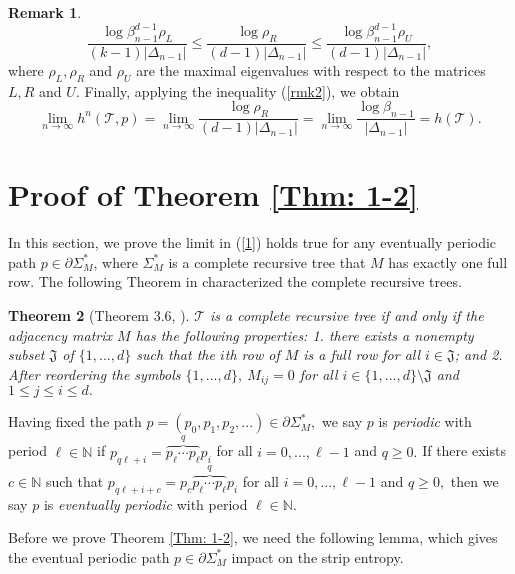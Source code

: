 \documentclass{amsart}
\newtheorem{theorem}{Theorem}[]
\theoremstyle{definition}
\newtheorem{remark}[theorem]{Remark}
\begin{document}
\begin{remark}
\begin{equation}\label{rmk2}
\frac{\log \beta_{n-1}^{d-1}\rho_L}{(k-1)\lvert\Delta_{n-1}\rvert}\leq
\frac{\log\rho_R}{(d-1)\lvert\Delta_{n-1}\rvert}\leq 
\frac{\log \beta_{n-1}^{d-1}\rho_U}{(d-1)\lvert\Delta_{n-1}\rvert}, 
\end{equation}
where $\rho_L,\rho_R$ and $\rho_U$ are the maximal eigenvalues with respect to the matrices $L,R$ and $U.$ Finally, applying the inequality (\ref{rmk2}), we obtain 
\[
\lim\limits_{n\rightarrow \infty}h^n(\mathcal{T},p)=\lim\limits_{n\rightarrow \infty}\frac{\log \rho_R}{(d-1)\lvert\Delta_{n-1}\rvert}=\lim\limits_{n\rightarrow \infty}\frac{\log \beta_{n-1}}{\lvert\Delta_{n-1}\rvert}=h(\mathcal{T}).
\]
\end{remark}

\section{Proof of Theorem \ref{Thm: 1-2}} \label{sub 3}
In this section, we prove the limit in (\ref{1}) holds true for any eventually periodic path $p\in\partial\Sigma_M^*$, where $\Sigma_M^*$ is a complete recursive tree that $M$ has exactly one full row. The following Theorem in \cite{ban2022Commutativity} characterized the complete recursive trees.
\begin{theorem}[Theorem 3.6, \cite{ban2022Commutativity}]\label{Thm: complete}
 $\mathcal{T}$ is a complete recursive tree if and only if the adjacency matrix $M$ has the following properties: 1. there exists a nonempty subset $\mathfrak{J}$ of $\{1,...,d\}$ such that the $i$th row of $M$ is a full row for all $i\in \mathfrak{J}$; and 2. After reordering the symbols $\{1,...,d\},~M_{ij}=0$ for all $i\in\{1,...,d\}\setminus \mathfrak{J}$ and $1\leq j\leq i\leq d.$ 
\end{theorem}

Having fixed the path $p=(p_0,p_1,p_2,...)\in\partial\Sigma^*_M,$ we say $p$ is \emph{periodic} with period $\ell\in\mathbb{N}$ if $p_{q\ell+i}=\overbrace{p_\ell\cdots p_\ell}^{q} p_i$ for all $i=0,...,\ell-1$ and $q\geq 0.$ If there exists $c\in\mathbb{N}$ such that $p_{q\ell+i+c}=p_c\overbrace{p_\ell\cdots p_\ell}^{q}p_i$ for all $i=0,...,\ell-1$ and $q\geq 0,$ then we say $p$ is \emph{eventually periodic} with period $\ell\in\mathbb{N}.$ 

Before we prove Theorem \ref{Thm: 1-2}, we need the following lemma, which gives the eventual periodic path $p\in\partial\Sigma^*_M$ impact on the strip entropy. 
\end{document}

